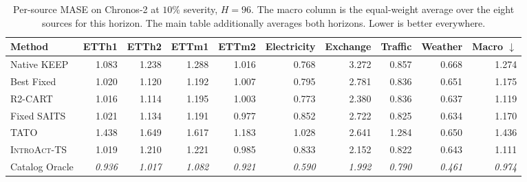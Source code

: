 \documentclass{article}
\newcommand{\oracle}[1]{\textit{\textcolor{phgray}{#1}}}
\newcommand{\introact}{\textsc{IntroAct-TS}}
\begin{document}
\begin{table}[htbp]
  \caption{Per-source MASE on Chronos-2 at $10\%$ severity, $H=96$. The macro column is the
  equal-weight average over the eight sources for this horizon. The main table additionally averages both horizons. Lower is better everywhere.}
  \label{tab:app-src-ch2-96}
  \centering
  \small
  \setlength{\tabcolsep}{3pt}
\begin{tabular*}{\textwidth}{@{\extracolsep{\fill}}lrrrrrrrrr@{}}
    \toprule
    Method & ETTh1 & ETTh2 & ETTm1 & ETTm2 & Electricity & Exchange & Traffic & Weather & Macro $\downarrow$ \\
    \midrule
    Native KEEP & 1.083 & 1.238 & 1.288 & 1.016 & 0.768 & 3.272 & 0.857 & 0.668 & 1.274 \\
    Best Fixed & 1.020 & 1.120 & 1.192 & 1.007 & 0.795 & 2.781 & 0.836 & 0.651 & 1.175 \\
    R2-CART & 1.016 & 1.114 & 1.195 & 1.003 & 0.773 & 2.380 & 0.836 & 0.637 & 1.119 \\
    Fixed SAITS & 1.021 & 1.134 & 1.191 & 0.977 & 0.852 & 2.722 & 0.825 & 0.634 & 1.170 \\
    TATO & 1.438 & 1.649 & 1.617 & 1.183 & 1.028 & 2.641 & 1.284 & 0.650 & 1.436 \\
    \midrule
    \rowcolor{bestgray}\introact{} & 1.019 & 1.210 & 1.221 & 0.985 & 0.833 & 2.152 & 0.822 & 0.643 & 1.111 \\
    \midrule
    Catalog Oracle & \oracle{0.936} & \oracle{1.017} & \oracle{1.082} & \oracle{0.921} & \oracle{0.590} & \oracle{1.992} & \oracle{0.790} & \oracle{0.461} & \oracle{0.974} \\
    \bottomrule
  \end{tabular*}
\end{table}
\end{document}
